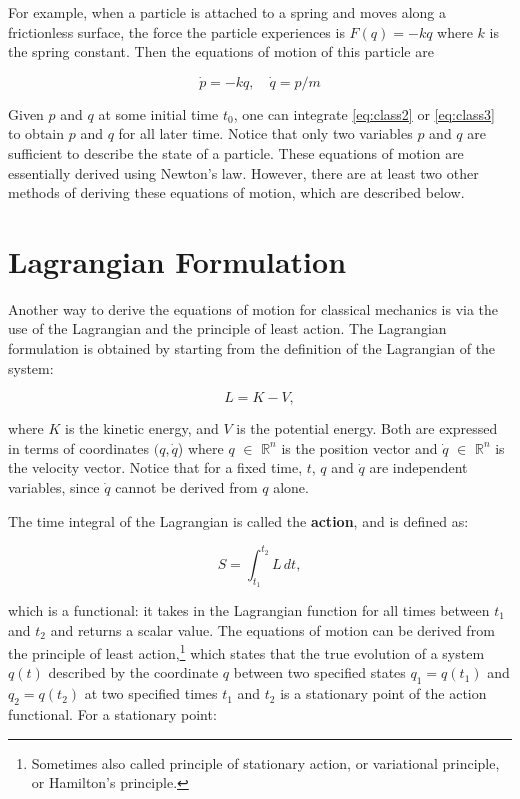\documentclass[
  9pt,
]{extbook}
\theoremstyle{definition}
\theoremstyle{definition}
\theoremstyle{definition}
\theoremstyle{remark}
\begin{document}
For example, when a particle is attached to a spring and moves along a frictionless surface, the force the particle experiences is \(F(q) = -kq\) where \(k\) is the spring constant. Then the equations of motion of this particle are

\begin{equation}
\dot{p}=-kq,\quad \dot{q}=p/m
\label{eq:class3}
\end{equation}

Given \(p\) and \(q\) at some initial time \(t_0\), one can integrate \eqref{eq:class2} or \eqref{eq:class3} to obtain \(p\) and \(q\) for all later time. Notice that only two variables \(p\) and \(q\) are sufficient to describe the state of a particle. These equations of motion are essentially derived using Newton's law. However, there are at least two other methods of deriving these equations of motion, which are described below.

\hypertarget{lagrangian-formulation}{%
\section{Lagrangian Formulation}\label{lagrangian-formulation}}

Another way to derive the equations of motion for classical mechanics is via the use of the Lagrangian and the principle of least action. The Lagrangian formulation is obtained by starting from the definition of the Lagrangian of the system:

\begin{equation}
L = K - V,
\label{eq:lag1}
\end{equation}

where \(K\) is the kinetic energy, and \(V\) is the potential energy. Both are expressed in terms of coordinates \((q,\dot{q}\)) where \(q\) \(\in\) \(\mathbb{R}^{n}\) is the position vector and \(\dot{q}\) \(\in\) \(\mathbb{R}^{n}\) is the velocity vector. Notice that for a fixed time, \(t\), \(q\) and \(\dot{q}\) are independent variables, since \(\dot{q}\) cannot be derived from \(q\) alone.

The time integral of the Lagrangian is called the \textbf{action}, and is defined as:

\begin{equation}
S = \int_{t_1}^{t_2} L\, dt,
\label{eq:lag2}
\end{equation}

which is a functional: it takes in the Lagrangian function for all times between \(t_1\) and \(t_2\) and returns a scalar value. The equations of motion can be derived from the principle of least action,\footnote{Sometimes also called principle of stationary action, or variational principle, or Hamilton's principle.} which states that the true evolution of a system \(q(t)\) described by the coordinate \(q\) between two specified states \(q_1 = q(t_1)\) and \(q_2 = q(t_2)\) at two specified times \(t_1\) and \(t_2\) is a stationary point of the action functional. For a stationary point:
\end{document}
